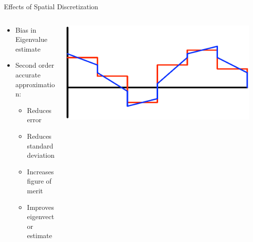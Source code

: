 \documentclass[xcolor={usenames, dvipsnames},]{beamer}
\begin{document}
\begin{frame}{Effects of Spatial Discretization}
\begin{columns}
    \begin{column}{0.5\textwidth}
        \begin{itemize}
            \item Bias in Eigenvalue estimate
                \vspace{1em}
            \item Second order accurate approximation:
                \begin{itemize}
                    \item Reduces error
                    \item Reduces standard deviation
                    \item Increases figure of merit
                    \item Improves eigenvector estimate
                \end{itemize}
        \end{itemize}
    \end{column}
    \begin{column}{0.5\textwidth}
        \includegraphics[width=\textwidth,keepaspectratio]{Figures/LinearCartoon}
    \end{column}
\end{columns}
\end{frame}
\end{document}
